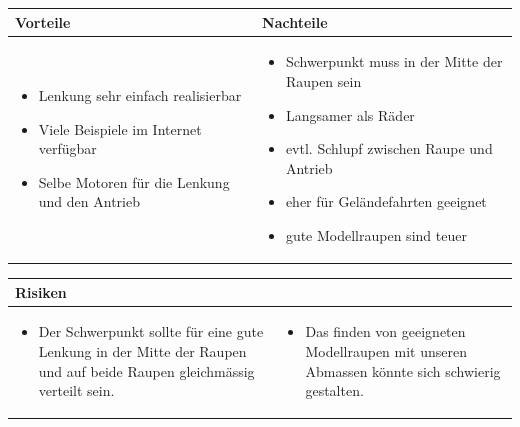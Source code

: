 \begin{table}[h]
\begin{tabular}{p{} | p{}}


 \textbf{Vorteile} & \textbf{Nachteile} \\ \hline
	 
\begin{itemize}
\item Lenkung sehr einfach realisierbar
\item Viele Beispiele im Internet verfügbar
\item Selbe Motoren für die Lenkung und den Antrieb
\end{itemize}

 
 &
 
\begin{itemize}
\item Schwerpunkt muss in der Mitte der Raupen sein
\item Langsamer als Räder
\item evtl. Schlupf zwischen Raupe und Antrieb
\item eher für Geländefahrten geeignet
\item gute Modellraupen sind teuer
\end{itemize}

\end{tabular}
\end{table}

\begin{table}[h]
\begin{tabular}{p{}p{}}


 \textbf{Risiken} & \\ \hline
	 
\begin{itemize}
\item Der Schwerpunkt sollte für eine gute Lenkung in der Mitte der Raupen und auf beide Raupen gleichmässig verteilt sein.
\end{itemize}
&
\begin{itemize}
\item Das finden von geeigneten Modellraupen mit unseren Abmassen könnte sich schwierig gestalten.
\end{itemize}


 
\end{tabular}
\end{table}

\pagebreak



